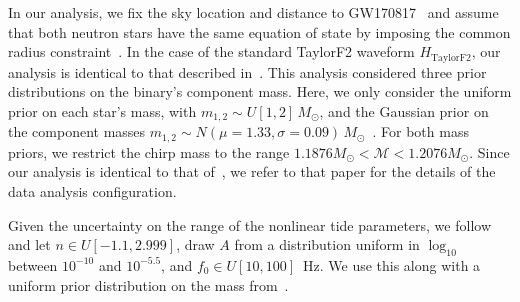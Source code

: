 In our analysis, we fix the sky location and distance to GW170817~\citep{Soares-Santos:2017lru,Cantiello:2018ffy} and assume that both neutron stars have the same equation of state by imposing the common radius constraint~\citep{de2018tidal}. In the case of the standard TaylorF2 waveform $H_\mathrm{TaylorF2}$, our analysis is identical to that described in~\cite{de2018tidal}. This analysis considered three prior distributions on the binary's component mass. Here, we only consider the uniform prior on each star's mass, with $m_{1,2} \sim U[1,2]\, M_\odot$, and the Gaussian prior on the component masses $m_{1,2} \sim N(\mu = 1.33, \sigma = 0.09)\, M_\odot$~\citep{Ozel:2016oaf}. For both mass priors, we restrict the chirp mass to the range $ 1.1876 M_\odot < \mathcal{M} < 1.2076 M_\odot$. Since our analysis is identical to that of~\citep{de2018tidal}, we refer to that paper for the details of the data analysis configuration.

Given the uncertainty on the range of the nonlinear tide parameters, we follow~\cite{abbott2019constraining} and let $n \in U[-1.1, 2.999]$, draw $A$ from a distribution uniform in $\log_{10}$ between $10^{-10}$ and $10^{-5.5}$, and $f_0 \in U[10, 100]$~Hz. We use this along with a uniform prior distribution on the mass from~\cite{de2018tidal}.

